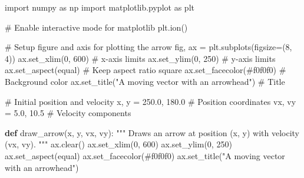 \documentclass[
  letterpaper,
  DIV=11,
  numbers=noendperiod]{scrreprt}
\newenvironment{Shaded}{\begin{snugshade}}{\end{snugshade}}
\newcommand{\CommentTok}[1]{\textcolor[rgb]{0.37,0.37,0.37}{#1}}
\newcommand{\DecValTok}[1]{\textcolor[rgb]{0.68,0.00,0.00}{#1}}
\newcommand{\FloatTok}[1]{\textcolor[rgb]{0.68,0.00,0.00}{#1}}
\newcommand{\ImportTok}[1]{\textcolor[rgb]{0.00,0.46,0.62}{#1}}
\newcommand{\KeywordTok}[1]{\textcolor[rgb]{0.00,0.23,0.31}{\textbf{#1}}}
\newcommand{\NormalTok}[1]{\textcolor[rgb]{0.00,0.23,0.31}{#1}}
\newcommand{\OperatorTok}[1]{\textcolor[rgb]{0.37,0.37,0.37}{#1}}
\newcommand{\StringTok}[1]{\textcolor[rgb]{0.13,0.47,0.30}{#1}}
\theoremstyle{definition}
\theoremstyle{remark}
\begin{document}
\begin{tcolorbox}[enhanced jigsaw, leftrule=.75mm, colbacktitle=quarto-callout-note-color!10!white, coltitle=black, colback=white, left=2mm, bottomtitle=1mm, arc=.35mm, titlerule=0mm, breakable, bottomrule=.15mm, opacitybacktitle=0.6, colframe=quarto-callout-note-color-frame, title=\textcolor{quarto-callout-note-color}{\faInfo}\hspace{0.5em}{CODE FOR ``moving vector in Python''}, opacityback=0, toprule=.15mm, toptitle=1mm, rightrule=.15mm]

\begin{Shaded}
\begin{Highlighting}[]
\ImportTok{import}\NormalTok{ numpy }\ImportTok{as}\NormalTok{ np}
\ImportTok{import}\NormalTok{ matplotlib.pyplot }\ImportTok{as}\NormalTok{ plt}

\CommentTok{\# Enable interactive mode for matplotlib}
\NormalTok{plt.ion()}

\CommentTok{\# Setup figure and axis for plotting the arrow}
\NormalTok{fig, ax }\OperatorTok{=}\NormalTok{ plt.subplots(figsize}\OperatorTok{=}\NormalTok{(}\DecValTok{8}\NormalTok{, }\DecValTok{4}\NormalTok{))}
\NormalTok{ax.set\_xlim(}\DecValTok{0}\NormalTok{, }\DecValTok{600}\NormalTok{)  }\CommentTok{\# x{-}axis limits}
\NormalTok{ax.set\_ylim(}\DecValTok{0}\NormalTok{, }\DecValTok{250}\NormalTok{)  }\CommentTok{\# y{-}axis limits}
\NormalTok{ax.set\_aspect(}\StringTok{\textquotesingle{}equal\textquotesingle{}}\NormalTok{)  }\CommentTok{\# Keep aspect ratio square}
\NormalTok{ax.set\_facecolor(}\StringTok{\textquotesingle{}\#f0f0f0\textquotesingle{}}\NormalTok{)  }\CommentTok{\# Background color}
\NormalTok{ax.set\_title(}\StringTok{"A moving vector with an arrowhead"}\NormalTok{)  }\CommentTok{\# Title}

\CommentTok{\# Initial position and velocity}
\NormalTok{x, y }\OperatorTok{=} \FloatTok{250.0}\NormalTok{, }\FloatTok{180.0}      \CommentTok{\# Position coordinates}
\NormalTok{vx, vy }\OperatorTok{=} \FloatTok{5.0}\NormalTok{, }\FloatTok{10.5}        \CommentTok{\# Velocity components}


\KeywordTok{def}\NormalTok{ draw\_arrow(x, y, vx, vy):}
    \CommentTok{"""}
\CommentTok{    Draws an arrow at position (x, y) with velocity (vx, vy).}
\CommentTok{    """}
\NormalTok{    ax.clear()}
\NormalTok{    ax.set\_xlim(}\DecValTok{0}\NormalTok{, }\DecValTok{600}\NormalTok{)}
\NormalTok{    ax.set\_ylim(}\DecValTok{0}\NormalTok{, }\DecValTok{250}\NormalTok{)}
\NormalTok{    ax.set\_aspect(}\StringTok{\textquotesingle{}equal\textquotesingle{}}\NormalTok{)}
\NormalTok{    ax.set\_facecolor(}\StringTok{\textquotesingle{}\#f0f0f0\textquotesingle{}}\NormalTok{)}
\NormalTok{    ax.set\_title(}\StringTok{"A moving vector with an arrowhead"}\NormalTok{)}


\end{Highlighting}
\end{Shaded}
\end{tcolorbox}
\end{document}
